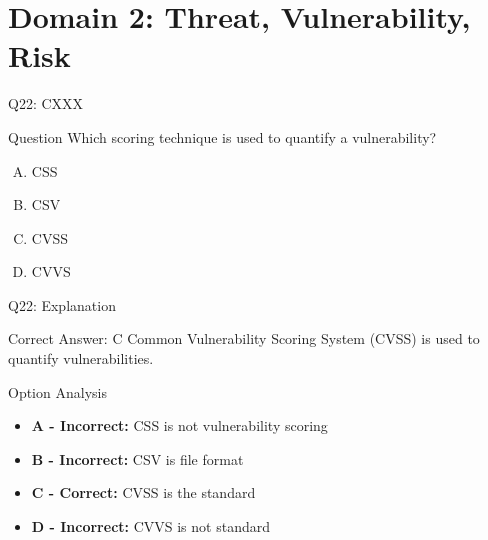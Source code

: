 \documentclass{beamer}
\begin{document}
	\section{Domain 2: Threat, Vulnerability, Risk}
	

	
	\begin{frame}{Q22: CXXX}
		\begin{block}{Question}
			Which scoring technique is used to quantify a vulnerability?
		\end{block}
		\begin{enumerate}[(A)]
			\item CSS
			\item CSV
			\item CVSS
			\item CVVS
		\end{enumerate}
	\end{frame}
	
	\begin{frame}{Q22: Explanation}
		\begin{block}{Correct Answer: C}
			Common Vulnerability Scoring System (CVSS) is used to quantify vulnerabilities.
		\end{block}
		\begin{block}{Option Analysis}
			\begin{itemize}
				\item \textbf{A - Incorrect:} CSS is not vulnerability scoring
				\item \textbf{B - Incorrect:} CSV is file format
				\item \textbf{C - Correct:} CVSS is the standard
				\item \textbf{D - Incorrect:} CVVS is not standard
			\end{itemize}
		\end{block}
	\end{frame}
	
	
	
\end{document}
